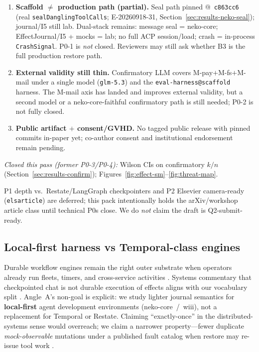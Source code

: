 \documentclass[11pt,a4paper]{article}
\begin{document}
\begin{enumerate}[label=\textbf{P0-\arabic*}]
\item \textbf{Scaffold $\neq$ production path (partial).}
  Seal path pinned @~\texttt{c863cc6} (real
  \texttt{sealDanglingToolCalls}; E-20260918-31,
  Section~\ref{sec:results-neko-seal}); journal/I5 still lab.
  Dual-stack remains: message seal = neko-core; EffectJournal/I5 + mocks =
  lab; no full ACP session/load; crash = in-process
  \texttt{CrashSignal}. P0-1 is \emph{not} closed. Reviewers may still ask
  whether B3 is the full production restore path.
\item \textbf{External validity still thin.} Confirmatory LLM covers
  M-pay$+$M-fs$+$M-mail under a single model
  (\texttt{glm-5.3}) and the \texttt{eval-harness@scaffold} harness. The
  M-mail axis has landed and improves external validity, but a second model
  or a neko-core-faithful confirmatory path is still needed; P0-2 is not
  fully closed.
\item \textbf{Public artifact $+$ consent/GVHD.} No tagged public release
  with pinned commits in-paper yet; co-author consent and institutional
  endorsement remain pending.
\end{enumerate}
\noindent\textit{Closed this pass (former P0-3/P0-4):}
Wilson CIs on confirmatory $k/n$ (Section~\ref{sec:results-confirm});
Figures~\ref{fig:effect-sm}--\ref{fig:threat-map}.

P1 depth vs.\ Restate/LangGraph checkpointers and P2 Elsevier camera-ready
(\texttt{elsarticle}) are deferred; this pack intentionally holds the
arXiv/workshop article class until technical P0s close. We do \emph{not}
claim the draft is Q2-submit-ready.

\subsection{Local-first harness vs Temporal-class engines}

Durable workflow engines remain the right outer substrate when operators
already run fleets, timers, and cross-service activities
\cite{temporal2026agentharness}. Systems commentary that checkpointed chat
is not durable execution of effects aligns with our vocabulary split
\cite{zylos2026durable}. Angle~A's non-goal is explicit: we study lighter
journal semantics for \textbf{local-first} agent development environments
(neko-core~/~wiii), not a replacement for Temporal or Restate. Claiming
``exactly-once'' in the distributed-systems sense would overreach; we claim
a narrower property---fewer duplicate \emph{mock-observable} mutations under
a published fault catalog when restore may re-issue tool work
\cite{acrfence2026}.
\end{document}
